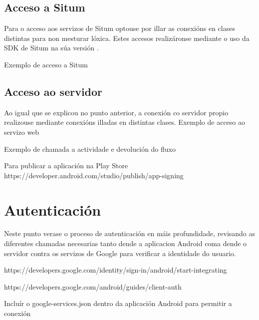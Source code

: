\subsection{Acceso a Situm}
Para o acceso aos servizos de Situm optouse por illar as conexións en clases distintas para non mesturar lóxica. Estes accesos realizáronse mediante o uso da SDK de Situm na súa versión .

Exemplo de acceso a Situm

\subsection{Acceso ao servidor}
Ao igual que se explicou no punto anterior, a conexión co servidor propio realizouse mediante conexións illadas en distintas clases. 
Exemplo de acceso ao servizo web




Exemplo de chamada a actividade e devolución do fluxo

Para publicar a aplicación na Play Store
https://developer.android.com/studio/publish/app-signing




\section{Autenticación}
Neste punto verase o proceso de autenticación en máis profundidade, revisando as diferentes chamadas necesarias tanto dende a aplicacion Android coma dende o servidor contra os servizos de Google para verificar a identidade do usuario.




https://developers.google.com/identity/sign-in/android/start-integrating


https://developers.google.com/android/guides/client-auth


Incluír o google-services.json dentro da aplicación Android para permitir a conexión